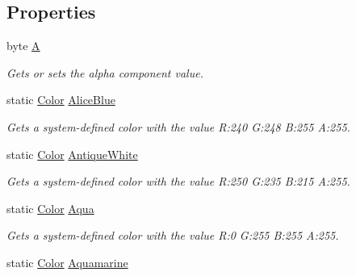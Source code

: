 \subsection*{Properties}
\begin{DoxyCompactItemize}
\item 
byte \hyperlink{structMicrosoft_1_1Xna_1_1Framework_1_1Color_a851238b137a20edbf656ad0b227c7657}{A}
\begin{DoxyCompactList}\small\item\em Gets or sets the alpha component value.\end{DoxyCompactList}\item 
static \hyperlink{structMicrosoft_1_1Xna_1_1Framework_1_1Color}{Color} \hyperlink{structMicrosoft_1_1Xna_1_1Framework_1_1Color_ac94287beea99da920d21f1abc87424c7}{Alice\+Blue}
\begin{DoxyCompactList}\small\item\em Gets a system-\/defined color with the value R\+:240 G\+:248 B\+:255 A\+:255.\end{DoxyCompactList}\item 
static \hyperlink{structMicrosoft_1_1Xna_1_1Framework_1_1Color}{Color} \hyperlink{structMicrosoft_1_1Xna_1_1Framework_1_1Color_a2061dfd6cbab3b2e74ae12d4a7bae4f5}{Antique\+White}
\begin{DoxyCompactList}\small\item\em Gets a system-\/defined color with the value R\+:250 G\+:235 B\+:215 A\+:255.\end{DoxyCompactList}\item 
static \hyperlink{structMicrosoft_1_1Xna_1_1Framework_1_1Color}{Color} \hyperlink{structMicrosoft_1_1Xna_1_1Framework_1_1Color_a0513bb5c88733f3c4a46e7d171e5818d}{Aqua}
\begin{DoxyCompactList}\small\item\em Gets a system-\/defined color with the value R\+:0 G\+:255 B\+:255 A\+:255.\end{DoxyCompactList}\item 
static \hyperlink{structMicrosoft_1_1Xna_1_1Framework_1_1Color}{Color} \hyperlink{structMicrosoft_1_1Xna_1_1Framework_1_1Color_a541991157a9af348f5eec8f51810d6eb}{Aquamarine}

\end{DoxyCompactItemize}
